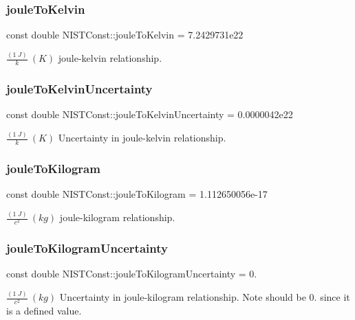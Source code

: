 \subsubsection{\texorpdfstring{joule\+To\+Kelvin}{jouleToKelvin}}
{\footnotesize\ttfamily const double N\+I\+S\+T\+Const\+::joule\+To\+Kelvin = 7.\+2429731e22}

$\frac{(1\ J)}{k} \ (K)$ joule-\/kelvin relationship. \mbox{\label{group___joule_ga32d9bd2dfbaa6786b317c517b17c2f59}} 
\subsubsection{\texorpdfstring{joule\+To\+Kelvin\+Uncertainty}{jouleToKelvinUncertainty}}
{\footnotesize\ttfamily const double N\+I\+S\+T\+Const\+::joule\+To\+Kelvin\+Uncertainty = 0.\+0000042e22}

$\frac{(1\ J)}{k} \ (K)$ Uncertainty in joule-\/kelvin relationship. \mbox{\label{group___joule_ga250f161277a6e581e695dccb7c11d1fb}} 
\subsubsection{\texorpdfstring{joule\+To\+Kilogram}{jouleToKilogram}}
{\footnotesize\ttfamily const double N\+I\+S\+T\+Const\+::joule\+To\+Kilogram = 1.\+112650056e-\/17}

$\frac{(1\ J)}{c^2} \ (kg)$ joule-\/kilogram relationship. \mbox{\label{group___joule_gaf14b109cdaf9892023dc33ceecdc0b9f}} 
\subsubsection{\texorpdfstring{joule\+To\+Kilogram\+Uncertainty}{jouleToKilogramUncertainty}}
{\footnotesize\ttfamily const double N\+I\+S\+T\+Const\+::joule\+To\+Kilogram\+Uncertainty = 0.}

$\frac{(1\ J)}{c^2} \ (kg)$ Uncertainty in joule-\/kilogram relationship. Note should be 0. since it is a defined value. 